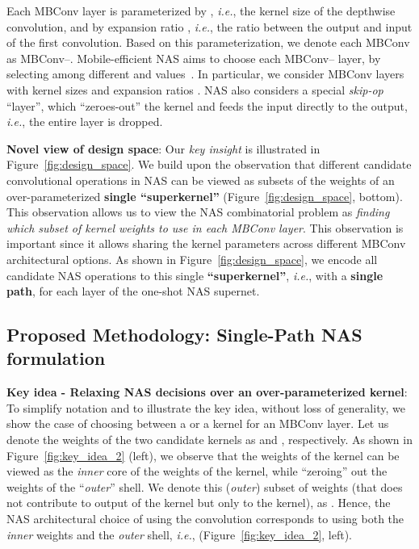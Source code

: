 \documentclass[runningheads]{llncs}
\begin{document}
Each MBConv layer is parameterized by , \textit{i.e.}, the kernel size
of the depthwise convolution, and by expansion ratio , \textit{i.e.}, 
the ratio between the output and input of the first 
 convolution. Based on this parameterization, we denote 
each MBConv as MBConv--.
Mobile-efficient NAS aims to choose each MBConv-- layer, 
by selecting among different  and  values~\cite{cai2018proxylessnas,wu2018fbnet}. 
In particular, we consider MBConv layers with kernel sizes  and 
expansion ratios . NAS also considers a special 
\textit{skip-op} ``layer'', which ``zeroes-out'' the kernel and feeds 
the input directly to the output, \textit{i.e.}, the entire layer is dropped. 


\textbf{Novel view of design space}: 
Our \textit{key insight} is illustrated in Figure~\ref{fig:design_space}. 
We build upon the observation that different candidate convolutional operations in NAS 
can be viewed as subsets of the weights of an over-parameterized 
\textbf{single ``superkernel''} (Figure~\ref{fig:design_space}, bottom). 
This observation allows us to view the NAS combinatorial problem as 
\textit{finding which subset of kernel weights to use in each MBConv layer}. 
This observation is important since it allows
sharing the kernel parameters across different MBConv
architectural options. As shown in Figure~\ref{fig:design_space},
we encode all candidate NAS operations to this single 
\textbf{``superkernel''}, \textit{i.e.}, with a \textbf{single path}, for each
layer of the one-shot NAS supernet. 


\subsection{Proposed Methodology: Single-Path NAS formulation}
\label{subsec:single-path-kernel}

\textbf{Key idea - Relaxing NAS decisions over an over-parameterized kernel}: 
To simplify notation and to illustrate the key idea, 
without loss of generality, we show the case of choosing between a 
 or a  kernel for an MBConv layer.
Let us denote the weights of the two candidate kernels as 
 and , respectively. 
As shown in Figure~\ref{fig:key_idea_2} (left), we observe that 
the weights of the  kernel can be viewed as 
the \textit{inner} core of the weights of the  kernel, 
while ``zeroing'' out the weights of the ``\textit{outer}'' shell.
We denote this (\textit{outer}) subset of weights (that does not contribute 
to output of the  kernel but only to the  kernel), 
as .
Hence, the NAS architectural choice of using 
the  convolution corresponds to using both 
the \textit{inner}  weights and the \textit{outer} shell, 
\textit{i.e.},  (Figure~\ref{fig:key_idea_2}, left). 
\end{document}

